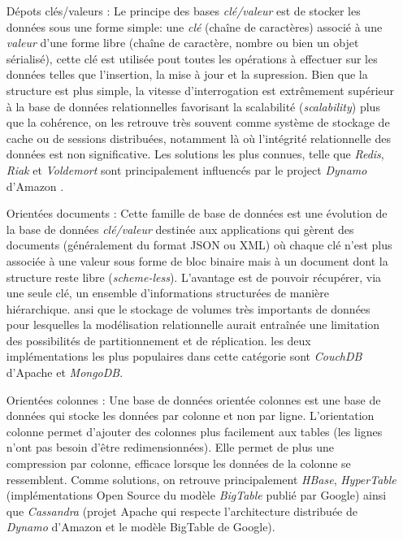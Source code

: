   \begin{itemize}
  \item [Dépots clés/valeurs]: Le principe des bases
    \textit{clé/valeur} est de stocker les données sous une forme
    simple: une \emph{clé } (chaîne de caractères) associé à une
    \emph{valeur} d'une forme libre (chaîne de caractère, nombre ou
    bien un objet sérialisé), cette clé est utilisée pout toutes les
    opérations à effectuer sur les données telles que l'insertion, la
    mise à jour et la supression. Bien que la structure est plus
    simple, la vitesse d'interrogation est extrêmement supérieur à la
    base de données relationnelles favorisant la scalabilité
    (\emph{scalability}) plus que la cohérence, on les retrouve très
    souvent comme système de stockage de cache ou de sessions
    distribuées, notamment là où l'intégrité relationnelle des données
    est non significative. Les solutions les plus connues, telle que
    \emph{Redis}, \emph{Riak} et \emph{Voldemort} sont principalement
    influencés par le project \emph{Dynamo} d'Amazon
    \cite{decandia2007dynamo}.
    \newpage

  \item [Orientées documents]: Cette famille de base de données est
    une évolution de la base de données \textit{clé/valeur} destinée
    aux applications qui gèrent des documents (généralement du format
    \textsc{JSON} ou \textsc{XML}) où chaque clé n'est plus associée à
    une valeur sous forme de bloc binaire mais à un document dont la
    structure reste libre (\textit{scheme-less}). L'avantage est de
    pouvoir récupérer, via une seule clé, un ensemble d’informations
    structurées de manière hiérarchique. ansi que le stockage de
    volumes très importants de données pour lesquelles la modélisation
    relationnelle aurait entraînée une limitation des possibilités de
    partitionnement et de réplication. les deux implémentations les
    plus populaires dans cette catégorie sont \emph{CouchDB} d'Apache
    et \emph{MongoDB}.

  \item [Orientées colonnes]: Une base de données orientée colonnes
    est une base de données qui stocke les données par colonne et non
    par ligne. L'orientation colonne permet d'ajouter des colonnes
    plus facilement aux tables (les lignes n'ont pas besoin d'être
    redimensionnées). Elle permet de plus une compression par colonne,
    efficace lorsque les données de la colonne se ressemblent. Comme
    solutions, on retrouve principalement \emph{HBase},
    \emph{HyperTable} (implémentations Open Source du modèle
    \emph{BigTable} \cite{chang2008bigtable} publié par Google) ainsi
    que \emph{Cassandra} (projet Apache qui respecte l'architecture
    distribuée de \emph{Dynamo} \cite{decandia2007dynamo} d'Amazon et
    le modèle BigTable de Google).


\end{itemize}
